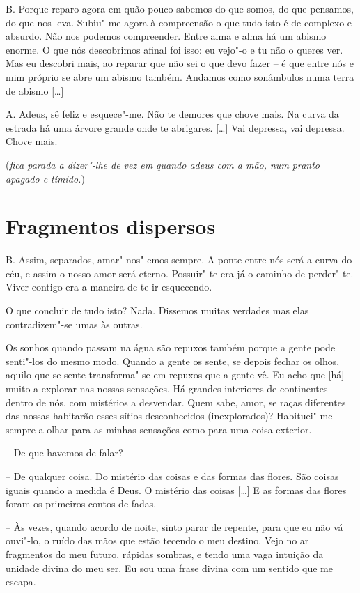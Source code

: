 \textsc{B.} Porque reparo agora em quão pouco sabemos do que somos, do que
pensamos, do que nos leva. Subiu"-me agora à compreensão o que tudo
isto é de complexo e absurdo. Não nos podemos compreender. Entre alma
e alma há um abismo enorme. O que nós descobrimos afinal foi isso: eu
vejo"-o e tu não o queres ver. Mas eu descobri mais, ao reparar que
não sei o que devo fazer -- é que entre nós e mim próprio se abre um
abismo também. Andamos como sonâmbulos numa terra de abismo [\ldots{}]

\textsc{A.} Adeus, sê feliz e esquece"-me. Não te demores que chove mais. Na
curva da estrada há uma árvore grande onde te abrigares. [\ldots{}] Vai
depressa, vai depressa. Chove mais.

\hfill(\textit{fica parada a dizer"-lhe de vez em quando adeus com a mão, num
pranto apagado e tímido.})


\section{Fragmentos dispersos}

\textsc{B.} Assim, separados, amar"-nos"-emos sempre. A ponte entre nós será a
curva do céu, e assim o nosso amor será eterno. Possuir"-te era já o
caminho de perder"-te. Viver contigo era a maneira de te ir
esquecendo.

O que concluir de tudo isto? Nada. Dissemos muitas verdades mas elas
contradizem"-se umas às outras.

Os sonhos quando passam na água são repuxos também porque a gente pode
senti"-los do mesmo modo. Quando a gente os sente, se depois fechar os
olhos, aquilo que se sente transforma"-se em repuxos que a gente vê.
Eu acho que [há] muito a explorar nas nossas sensações. Há grandes
interiores de continentes dentro de nós, com mistérios a desvendar.
Quem sabe, amor, se raças diferentes das nossas habitarão esses
sítios desconhecidos (inexplorados)? Habituei"-me sempre a olhar para
as minhas sensações como para uma coisa exterior.

-- De que havemos de falar?

-- De qualquer coisa. Do mistério das coisas e das formas das flores.
São coisas iguais quando a medida é Deus. O mistério das coisas [\ldots{}]
E as formas das flores foram os primeiros contos de fadas.

-- Às vezes, quando acordo de noite, sinto parar de repente, para que
eu não vá ouvi"-lo, o ruído das mãos que estão tecendo o meu destino.
Vejo no ar fragmentos do meu futuro, rápidas sombras, e tendo uma
vaga intuição da unidade divina do meu ser. Eu sou uma frase divina
com um sentido que me escapa.

